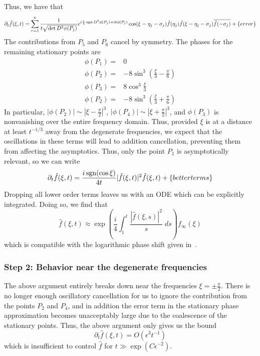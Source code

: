 \documentclass[letterpaper, reqno,final]{amsart}
\DeclareMathOperator{\sign}{sgn}
\DeclareMathOperator{\sgn}{sgn}
\newcommand{\fhPi}{\frac{\pi}{2}}
\newcommand{\btext}[1]{\left\{\textup{#1}\right\}}
\begin{document}
Thus, we have that
\begin{equation*}
    \partial_t \hat{f}(\xi,t) = \sum_{r = 1}^6 \frac{1}{t \sqrt{\det D^2 \phi(P_j)}} e^{i\frac{\pi}{4}\sign D^2 \phi(P_j) + it \phi(P_j)} \cos(\xi - \eta_j - \sigma_j) \hat{f}(\eta_j) \hat{f}(\xi - \eta_j - \sigma_j) \overline{\hat{f}(-\sigma_j)} + \btext{error}
\end{equation*}
The contributions from $P_5$ and $P_6$ cancel by symmetry.  The phases for the remaining stationary points are
\begin{equation*}\begin{split}
    \phi(P_1) =& 0\\
    \phi(P_2) =& -8 \sin^3 \left( \frac{\xi}{3} - \frac{\pi}{6}\right)\\
    \phi(P_3) =& 8 \cos^3 \frac{\xi}{3}\\
    \phi(P_2) =& -8 \sin^3 \left( \frac{\xi}{3} + \frac{\pi}{6}\right)
\end{split}
\end{equation*}
In particular, $|\phi(P_2)| \sim \left|\xi - \fhPi\right|^3$, $|\phi(P_4)| \sim \left| \xi + \fhPi\right|^3$, and $\phi(P_3)$ is nonvanishing over the entire frequency domain.  Thus, provided $\xi$ is at a distance at least $t^{-1/3}$ away from the degenerate frequencies, we expect that the oscillations in these terms will lead to addition cancellation,  preventing them from affecting the asymptotics.  Thus, only the point $P_1$ is asymptotically relevant, so we can write
\begin{equation*}
    \partial_t \hat{f}(\xi,t) = \frac{i \sgn(\cos \xi)}{4t}|\hat{f}(\xi,t)|^2 \hat{f}(\xi,t) + \btext{better terms}
\end{equation*}
Dropping all lower order terms leaves us with an ODE which can be explicitly integrated.  Doing so, we find that
\begin{equation*}
    \hat{f}(\xi,t) \approx \exp\left(\frac{i}{4} \int_1^t \frac{|\hat{f}(\xi,s)|^2}{s}\;ds\right) f_\infty(\xi)
\end{equation*}
which is compatible with the logarithmic phase shift given in~.

\subsubsection{Step 2: Behavior near the degenerate frequencies}

The above argument entirely breaks down near the frequencies $\xi = \pm \fhPi$.  There is no longer enough oscillatory cancellation for us to ignore the contribution from the points $P_2$ and $P_4$, and in addition the error term in the stationary phase approximation becomes unacceptably large due to the coalescence of the stationary points.  Thus, the above argument only gives us the bound
\begin{equation*}
    \partial_t \hat{f}(\xi,t) = O(\epsilon^3 t^{-1})
\end{equation*}
which is insufficient to control $\hat{f}$ for $t \gg \exp\left(C \epsilon^{-2}\right)$.  
\end{document}
